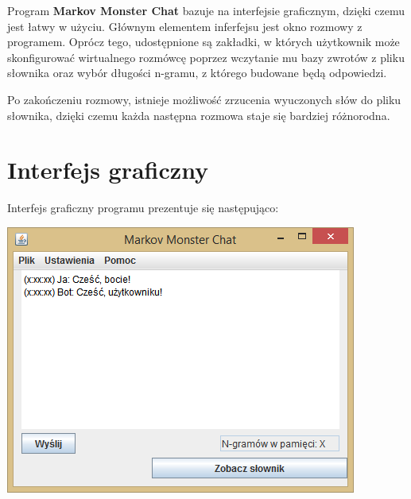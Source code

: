 \documentclass{article}
\begin{document}
Program \textbf{Markov Monster Chat} bazuje na interfejsie graficznym, dzięki czemu jest łatwy
w użyciu. Głównym elementem inferfejsu jest okno rozmowy z programem. Oprócz tego, udostępnione są zakładki, w których użytkownik może skonfigurować wirtualnego rozmówcę poprzez wczytanie mu bazy zwrotów z pliku słownika oraz wybór długości n-gramu, z którego budowane będą odpowiedzi.

Po zakończeniu rozmowy, istnieje możliwość zrzucenia wyuczonych słów do pliku słownika, dzięki
czemu każda następna rozmowa staje się bardziej różnorodna.


\section{Interfejs graficzny}

Interfejs graficzny programu prezentuje się następująco:

\bigskip
\includegraphics{mmchat}
\end{document}
